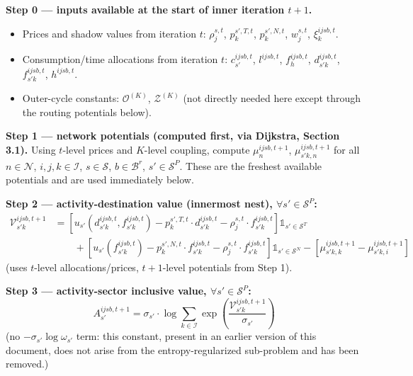 \documentclass[11pt,a4paper]{article}
\newcommand{\IV}{\mathcal{V}}
\begin{document}
\textbf{Step 0 — inputs available at the start of inner iteration $t+1$.}
\begin{itemize}[leftmargin=*]
    \item Prices and shadow values from iteration $t$: $\rho_j^{s,t}$, $p_k^{s',T,t}$, $p_k^{s',N,t}$, $w_j^{s,t}$, $\xi_k^{ijsb,t}$.
    \item Consumption/time allocations from iteration $t$: $c^{ijsb,t}_{s'}$, $l^{ijsb,t}$, $f_h^{ijsb,t}$, $d^{ijsb,t}_{s'k}$, $f^{ijsb,t}_{s'k}$, $h^{ijsb,t}$.
    \item Outer-cycle constants: $\mathcal{O}^{(K)}$, $\mathcal{Z}^{(K)}$ (not directly needed here except through the routing potentials below).
\end{itemize}

\textbf{Step 1 — network potentials (computed first, via Dijkstra, Section 3.1).} Using $t$-level prices and $K$-level coupling, compute $\mu^{ijsb,t+1}_n$, $\mu^{ijsb,t+1}_{s'k,n}$ for all $n \in \mathcal{N}$, $i,j,k\in\mathcal{I}$, $s\in\mathcal{S}$, $b\in\mathcal{B}^r$, $s'\in\mathcal{S}^P$. These are the freshest available potentials and are used immediately below.

\textbf{Step 2 — activity-destination value (innermost nest), $\forall s'\in\mathcal{S}^P$:}
\begin{align}
    \IV^{ijsb, t+1}_{s'k} &= \left [ u_{s'}(d^{ijsb,t}_{s'k}, f^{ijsb,t}_{s'k}) - p^{s',T,t}_k \cdot d^{ijsb,t}_{s'k} - \rho^{s,t}_j \cdot f^{ijsb,t}_{s'k} \right] \mathbb{1}_{s' \in \mathcal{S}^T} \nonumber \\
    &\qquad + \left [ u_{s'}(f^{ijsb,t}_{s'k}) - p^{s',N,t}_k \cdot f^{ijsb,t}_{s'k} - \rho_j^{s,t} \cdot  f^{ijsb,t}_{s'k} \right] \mathbb{1}_{s' \in \mathcal{S}^N} - \left[\mu^{ijsb, t+1}_{s'k,k} - \mu^{ijsb, t+1}_{s'k,i}\right]
    \label{eq:iv_activity}
\end{align}
(uses $t$-level allocations/prices, $t+1$-level potentials from Step 1).

\textbf{Step 3 — activity-sector inclusive value, $\forall s'\in\mathcal{S}^P$:}
\begin{equation}
    A^{ijsb, t+1}_{s'} = \sigma_{s'} \cdot \log \sum_{k \in \mathcal{I}} \exp\left(\frac{\IV^{ijsb,t+1}_{s'k}}{\sigma_{s'}}\right)
    \label{eq:iv_A}
\end{equation}
(no $-\sigma_{s'}\log\omega_{s'}$ term: this constant, present in an earlier version of this document, does not arise from the entropy-regularized sub-problem and has been removed.)
\end{document}

